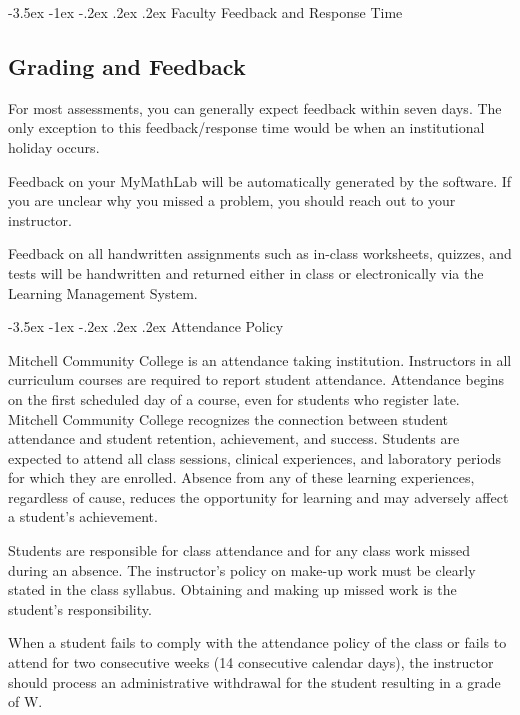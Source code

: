\documentclass{article}
\makeatletter
\renewcommand\section{\@startsection{section}{1}{0pt}%
  {-3.5ex \@plus -1ex \@minus -.2ex}%
  {.2ex \@plus.2ex}%
  {\normalfont\Large\bfseries}} %
\makeatother
\begin{document}
\section{Faculty Feedback and Response Time}

\subsection{Grading and Feedback}

For most assessments, you can generally expect feedback within seven days. The only exception to this feedback/response time would be when an institutional holiday occurs.

Feedback on your MyMathLab will be automatically generated by the software. If you are unclear why you missed a problem, you should reach out to your instructor.

Feedback on all handwritten assignments such as in-class worksheets, quizzes, and tests will be handwritten and returned either in class or electronically via the Learning Management System.

\section{Attendance Policy}

Mitchell Community College is an attendance taking institution. Instructors in all curriculum courses are required to report student attendance. Attendance begins on the first scheduled day of a course, even for students who register late. Mitchell Community College recognizes the connection between student attendance and student retention, achievement, and success. Students are expected to attend all class sessions, clinical experiences, and laboratory periods for which they are enrolled. Absence from any of these learning experiences, regardless of cause, reduces the opportunity for learning and may adversely affect a student's achievement.

Students are responsible for class attendance and for any class work missed during an absence. The instructor's policy on make-up work must be clearly stated in the class syllabus. Obtaining and making up missed work is the student's responsibility.

When a student fails to comply with the attendance policy of the class or fails to attend for two consecutive weeks (14 consecutive calendar days), the instructor should process an administrative withdrawal for the student resulting in a grade of W.
\end{document}
